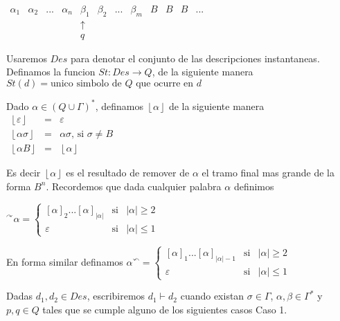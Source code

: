 \(\displaystyle \begin{array}{cccccccccccc} \alpha _{1} & \alpha _{2} & ... & \alpha _{n} & \beta _{1} & \beta _{2} & ... & \beta _{m} & B & B & B & ... \\ & & & & \uparrow & & & & & & & \\ & & & & q & & & & & & & \end{array} \)

Usaremos \(Des\) para denotar el conjunto de las descripciones instantaneas. Definamos la funcion \(St:Des\rightarrow Q\), de la siguiente manera
\(\displaystyle St(d)=\text{unico simbolo de }Q\text{ que ocurre en }d \)

Dado \(\alpha \in (Q\cup \Gamma )^{\ast }\), definamos \(\left\lfloor \alpha \right\rfloor \) de la siguiente manera
\(\displaystyle \begin{array}{rcl} \left\lfloor \varepsilon \right\rfloor & =& \varepsilon \\ \left\lfloor \alpha \sigma \right\rfloor & =& \alpha \sigma \text{, si }\sigma \neq B \\ \left\lfloor \alpha B\right\rfloor & =& \left\lfloor \alpha \right\rfloor \end{array} \)

Es decir \(\left\lfloor \alpha \right\rfloor \) es el resultado de remover de \( \alpha \) el tramo final mas grande de la forma \(B^{n}\).
Recordemos que dada cualquier palabra \(\alpha \) definimos

\(\displaystyle ^{\curvearrowright }\alpha =\left\{ \begin{array}{lll} \left[ \alpha \right] _{2}...\left[ \alpha \right] _{\left\vert \alpha \right\vert } & \text{si} & \left\vert \alpha \right\vert \geq 2 \\ \varepsilon & \text{si} & \left\vert \alpha \right\vert \leq 1 \end{array} \right. \)

En forma similar definamos
\(\displaystyle \alpha ^{\curvearrowleft }=\left\{ \begin{array}{lll} \left[ \alpha \right] _{1}...\left[ \alpha \right] _{\left\vert \alpha \right\vert -1} & \text{si} & \left\vert \alpha \right\vert \geq 2 \\ \varepsilon & \text{si} & \left\vert \alpha \right\vert \leq 1 \end{array} \right. \)

Dadas \(d_{1},d_{2}\in Des\), escribiremos \(d_{1}\vdash d_{2}\) cuando existan \( \sigma \in \Gamma \), \(\alpha ,\beta \in \Gamma ^{\ast }\) y \(p,q\in Q\) tales que se cumple alguno de los siguientes casos
Caso 1.

